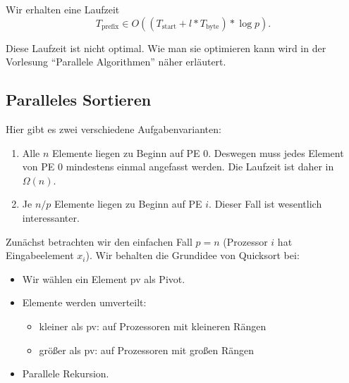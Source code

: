 Wir erhalten eine Laufzeit
\begin{equation*}
  T_\text{prefix} \in O((T_\text{start} + l * T_\text{byte}) * \log p)\text{.}
\end{equation*}

Diese Laufzeit ist nicht optimal. Wie man sie optimieren kann wird in der Vorlesung ``Parallele Algorithmen'' näher erläutert.

\subsection{Paralleles Sortieren}

Hier gibt es zwei verschiedene Aufgabenvarianten:

\begin{enumerate}
  \item Alle \( n \) Elemente liegen zu Beginn auf PE 0. Deswegen muss jedes Element von PE 0 mindestens einmal angefasst werden. Die Laufzeit ist daher in \( \Omega(n) \).
  \item Je \( n/p \) Elemente liegen zu Beginn auf PE \( i \). Dieser Fall ist wesentlich interessanter.
\end{enumerate}

Zunächst betrachten wir den einfachen Fall \( p = n \) (Prozessor \( i \) hat Eingabeelement \( x_i \)). Wir behalten die Grundidee von Quicksort bei:
\begin{itemize}
  \item Wir wählen ein Element pv als Pivot.
  \item Elemente werden umverteilt:
  \begin{itemize}
    \item kleiner als pv: auf Prozessoren mit kleineren Rängen
    \item größer als pv: auf Prozessoren mit großen Rängen
  \end{itemize}
  \item Parallele Rekursion.
\end{itemize}
